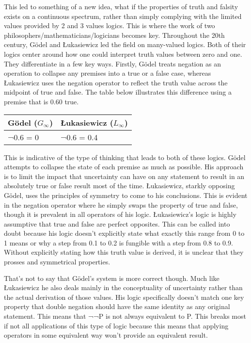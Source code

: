 \documentclass{article}
\begin{document}
This led to something of a new idea, what if the properties of truth and falsity exists on a continuous spectrum, rather than simply complying with the limited values provided by 2 and 3 values logics. This is where the work of two philosophers/mathematicians/logicians becomes key. Throughout the 20th century, Gödel and Łukasiewicz led the field on many-valued logics. Both of their logics center around how one could interpret truth values between zero and one. They differentiate in a few key ways. Firstly, Gödel treats negation as an operation to collapse any premises into a true or a false case, whereas Łukasiewicz uses the negation operator to reflect the truth value across the midpoint of true and false. The table below illustrates this difference using a premise that is 0.60 true. 

\begin{center}
\begin{tabularx}{0.8\textwidth} { 
  | >{\centering\arraybackslash}X 
  | >{\centering\arraybackslash}X  | }
 \hline
 Gödel ($G_\infty$) &  Łukasiewicz ($L_\infty$) \\
 \hline
 ¬0.6 = 0  & ¬0.6 = 0.4  \\
\hline
\end{tabularx}
\end{center}

This is indicative of the type of thinking that leads to both of these logics. Gödel attempts to collapse the state of each premise as much as possible. His approach is to limit the impact that uncertainty can have on any statement to result in an absolutely true or false result most of the time. Łukasiewicz, starkly opposing Gödel, uses the principles of symmetry to come to his conclusions. This is evident in the negation operator where he simply swaps the property of true and false, though it is prevalent in all operators of his logic. Łukasiewicz’s logic is highly assumptive that true and false are perfect opposites. This can be called into doubt because his logic doesn’t explicitly state what exactly this range from 0 to 1 means or why a step from 0.1 to 0.2 is fungible with a step from 0.8 to 0.9. Without explicitly stating how this truth value is derived, it is unclear that they prosses and symmetrical properties. 

That’s not to say that Gödel’s system is more correct though. Much like Łukasiewicz he also deals mainly in the conceptuality of uncertainty rather than the actual derivation of those values. His logic specifically doesn’t match one key property that double negation should have the same identity as any original statement. This means that ¬¬P is not always equivalent to P. This breaks most if not all applications of this type of logic because this means that applying operators in some equivalent way won’t provide an equivalent result.
\end{document}
